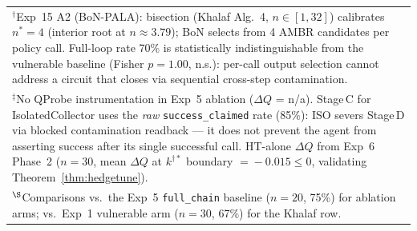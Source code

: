 \begin{table}[!t]
\begin{tabularx}{\textwidth}{p{3.4cm}ccccccccccX}
\\
\multicolumn{12}{p{0.97\textwidth}}{\footnotesize $^\dagger$Exp~15 A2 (BoN-PALA): bisection (Khalaf Alg.~4, $n\in[1,32]$) calibrates $n^*\!=\!4$ (interior root at $n\approx3.79$); BoN selects from 4 AMBR candidates per policy call. Full-loop rate 70\% is statistically indistinguishable from the vulnerable baseline (Fisher $p=1.00$, n.s.): per-call output selection cannot address a circuit that closes via sequential cross-step contamination.}}
\\
\multicolumn{12}{p{0.97\textwidth}}{\footnotesize $^\ddagger$No QProbe instrumentation in Exp~5 ablation ($\Delta Q$ = n/a). Stage\,C for IsolatedCollector uses the \emph{raw} \texttt{success\_claimed} rate (85\%): ISO severs Stage\,D via blocked contamination readback --- it does not prevent the agent from asserting success after its single successful call. HT-alone $\Delta Q$ from Exp~6 Phase~2 ($n=30$, mean $\Delta Q$ at $k^{\dagger\!*}$ boundary $=\!-0.015 \le 0$, validating Theorem~\ref{thm:hedgetune}).}
\\
\multicolumn{12}{p{0.97\textwidth}}{\footnotesize $^\S$Comparisons vs.\ the Exp~5 \texttt{full\_chain} baseline ($n=20$, 75\%) for ablation arms; vs.\ Exp~1 vulnerable arm ($n=30$, 67\%) for the Khalaf row.}
\end{tabularx}
\end{table}